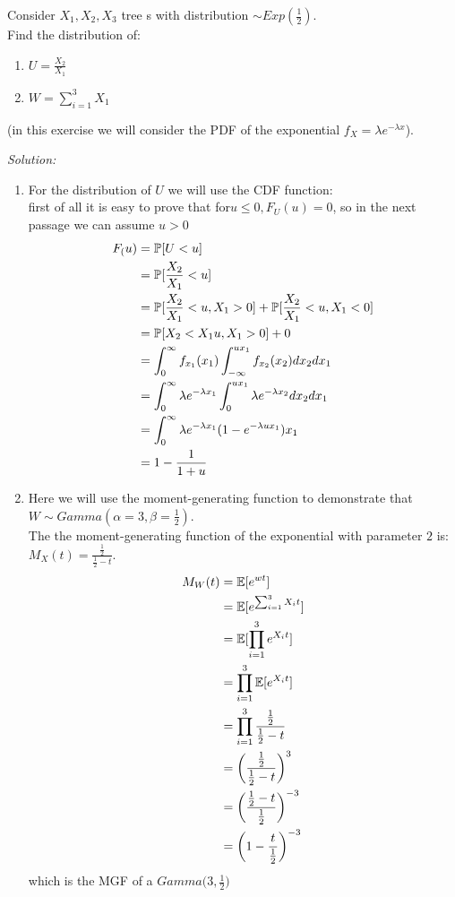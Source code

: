 \begin{ex}
	Consider $X_1,X_2,X_3$ tree \rv s \iid with distribution $\sim Exp(\frac{1}{2})$.\\
	Find the distribution of:
	\begin{enumerate}
		\item $U=\frac{X_2}{X_1}$
		\item $W=\sum_{i=1}^{3}X_1$
	\end{enumerate}
	(in this exercise we will consider the PDF of the exponential $f_X=\lambda e^{-\lambda x}$).

\textit{Solution:}
\begin{enumerate}
	\item For the distribution of $U$ we will use the CDF function:\\
	first of all it is easy to prove that for$u\leq 0,F_U(u)=0$, so in the next passage we can assume $u>0$ 
	\[
	\begin{split}
	F_(u)
	&=\mathbb{P} [U<u]\\
	&=\mathbb{P}[\frac{X_2}{X_1}<u]\\
	&=\mathbb{P}[\frac{X_2}{X_1}<u,X_1>0]+\mathbb{P}[\frac{X_2}{X_1}<u,X_1<0]\\
	&=\mathbb{P}[X_2<X_1u,X_1>0]+0\\
	&=\int_{0}^{\infty}f_{x_1}(x_1)\int_{-\infty}^{ux_1}f_{x_2}(x_2)dx_2dx_1\\
	&=\int_{0}^{\infty}\lambda e^{-\lambda x_1}\int_{0}^{ux_1}\lambda e^{-\lambda x_2}dx_2dx_1\\
	&=\int_{0}^{\infty}\lambda e^{-\lambda x_1}(1-e^{-\lambda ux_1})x_1\\
	&=1-\frac{1}{1+u}
	\end{split}
	\]
	\item Here we will use the moment-generating function to demonstrate that $W\sim Gamma(\alpha =3, \beta=\frac{1}{2})$.\\
	The the moment-generating function of the exponential with parameter $2$ is: $M_X(t)=\frac{\frac{1}{2}}{\frac{1}{2}-t}$.
	\[
	\begin{split}
	M_W(t)
	&=\mathbb{E} [e^{wt}]\\
	&=\mathbb{E} [e^{\sum_{i=1}^{3}X_it}]\\
	&=\mathbb{E} [\prod_{i=1}^{3}e^{X_it}]\\
	&=\prod_{i=1}^{3} \mathbb{E} [e^{X_it}]\\
	&=\prod_{i=1}^{3} \frac{\frac{1}{2}}{\frac{1}{2}-t} \\
	&=\bigg( \frac{\frac{1}{2}}{\frac{1}{2}-t} \bigg) ^3\\
	&=\bigg( \frac{\frac{1}{2}-t}{\frac{1}{2}} \bigg)^{-3}\\
	&=\bigg( 1-\frac{t}{\frac{1}{2}} \bigg)^{-3}
	\end{split}
	\]
	which is the MGF of a $Gamma\big( 3,\frac{1}{2} \big)$
\end{enumerate}
\end{ex}
